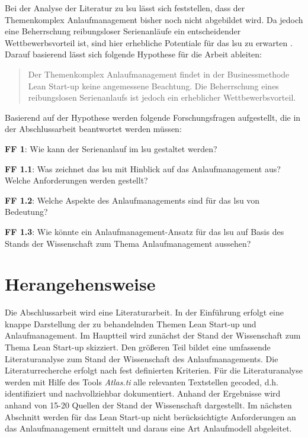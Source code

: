 Bei der Analyse der Literatur zu \gls{lsu} lässt sich feststellen, dass der Themenkomplex Anlaufmanagement bisher noch nicht abgebildet wird. Da jedoch eine Beherrschung reibungsloser Serienanläufe ein entscheidender Wettbewerbsvorteil ist, sind hier erhebliche Potentiale für das \gls{lsu} zu erwarten \cite[S.XI]{Bischoff2007}. Darauf basierend lässt sich folgende Hypothese für die Arbeit ableiten: 

\begin{quotation}
Der Themenkomplex Anlaufmanagement findet in der Businessmethode Lean Start-up keine angemessene Beachtung. Die Beherrschung eines reibungslosen Serienanlaufs ist jedoch ein erheblicher Wettbewerbsvorteil. 
\end{quotation}
Basierend auf der Hypothese werden folgende Forschungsfragen aufgestellt, die in der Abschlussarbeit beantwortet werden müssen: 

\textbf{FF 1}: Wie kann der Serienanlauf im \gls{lsu} gestaltet werden? 

\textbf{FF 1.1}: Was zeichnet das \gls{lsu} mit Hinblick auf das Anlaufmanagement aus? Welche Anforderungen werden gestellt?

\textbf{FF 1.2}: Welche Aspekte des Anlaufmanagements sind für das \gls{lsu} von Bedeutung? 

\textbf{FF 1.3}: Wie könnte ein Anlaufmanagement-Ansatz für das \gls{lsu} auf Basis des Stands der Wissenschaft zum Thema Anlaufmanagement aussehen?  


\section{Herangehensweise}
Die Abschlussarbeit wird eine Literaturarbeit. In der Einführung erfolgt eine knappe Darstellung der zu behandelnden Themen Lean Start-up und Anlaufmanagement. Im Hauptteil wird zunächst der Stand der Wissenschaft zum Thema Lean Start-up skizziert. Den größeren Teil bildet eine umfassende Literaturanalyse zum Stand der Wissenschaft des Anlaufmanagements. Die Literaturrecherche erfolgt nach fest definierten Kriterien. Für die Literaturanalyse werden mit Hilfe des Tools \textit{Atlas.ti} alle relevanten Textstellen gecoded, d.h. identifiziert und nachvollziehbar dokumentiert. Anhand der  Ergebnisse wird anhand von 15-20 Quellen der Stand der Wissenschaft dargestellt. Im nächsten Abschnitt werden für das Lean Start-up nicht berücksichtigte Anforderungen an das Anlaufmanagement ermittelt und daraus eine Art Anlaufmodell abgeleitet. 

